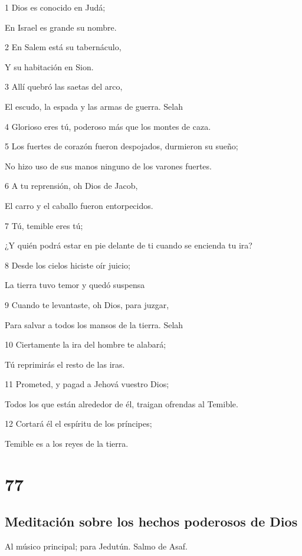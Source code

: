 \par 1 Dios es conocido en Judá;
\par En Israel es grande su nombre.
\par 2 En Salem está su tabernáculo,
\par Y su habitación en Sion.
\par 3 Allí quebró las saetas del arco,
\par El escudo, la espada y las armas de guerra. Selah
\par 4 Glorioso eres tú, poderoso más que los montes de caza.
\par 5 Los fuertes de corazón fueron despojados, durmieron su sueño;
\par No hizo uso de sus manos ninguno de los varones fuertes.
\par 6 A tu reprensión, oh Dios de Jacob,
\par El carro y el caballo fueron entorpecidos.
\par 7 Tú, temible eres tú;
\par ¿Y quién podrá estar en pie delante de ti cuando se encienda tu ira?
\par 8 Desde los cielos hiciste oír juicio;
\par La tierra tuvo temor y quedó suspensa
\par 9 Cuando te levantaste, oh Dios, para juzgar,
\par Para salvar a todos los mansos de la tierra. Selah
\par 10 Ciertamente la ira del hombre te alabará;
\par Tú reprimirás el resto de las iras.
\par 11 Prometed, y pagad a Jehová vuestro Dios;
\par Todos los que están alrededor de él, traigan ofrendas al Temible.
\par 12 Cortará él el espíritu de los príncipes;
\par Temible es a los reyes de la tierra.

\chapter{77}

\section*{Meditación sobre los hechos poderosos de Dios}

\par Al músico principal; para Jedutún. Salmo de Asaf.

